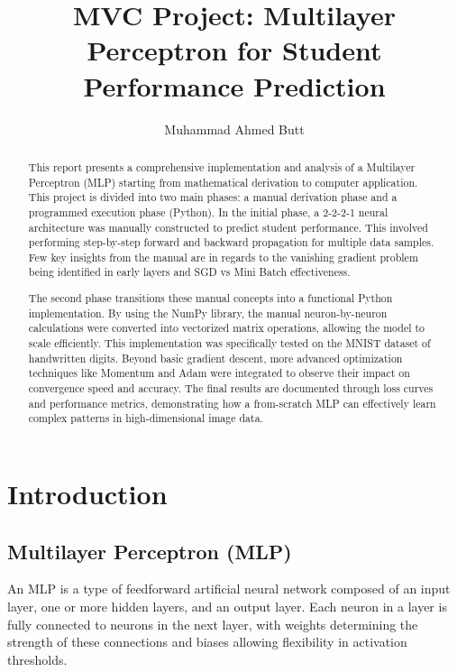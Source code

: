 \documentclass[runningheads]{llncs}
\begin{document}
\title{MVC Project: Multilayer Perceptron for Student Performance Prediction}
\author{Muhammad Ahmed Butt}

\maketitle 
\begin{abstract}
This report presents a comprehensive implementation and analysis of a Multilayer Perceptron (MLP) starting from mathematical derivation to computer application. This project is divided into two main phases: a manual derivation phase and a programmed execution phase (Python). In the initial phase, a 2-2-2-1 neural architecture was manually constructed to predict student performance. This involved performing step-by-step forward and backward propagation for multiple data samples. Few key insights from the manual are in regards to the vanishing gradient problem being identified in early layers and SGD vs Mini Batch effectiveness.

The second phase transitions these manual concepts into a functional Python implementation. By using the NumPy library, the manual neuron-by-neuron calculations were converted into vectorized matrix operations, allowing the model to scale efficiently. This implementation was specifically tested on the MNIST dataset of handwritten digits. Beyond basic gradient descent, more advanced optimization techniques like Momentum and Adam were integrated to observe their impact on convergence speed and accuracy. The final results are documented through loss curves and performance metrics, demonstrating how a from-scratch MLP can effectively learn complex patterns in high-dimensional image data.

\end{abstract}
\section{Introduction}
\subsection{Multilayer Perceptron (MLP)}
An MLP is a type of feedforward artificial neural network composed of an input layer, one or more hidden layers, and an output layer. Each neuron in a layer is fully connected to neurons in the next layer, with weights determining the strength of these connections and biases allowing flexibility in activation thresholds.
\end{document}
